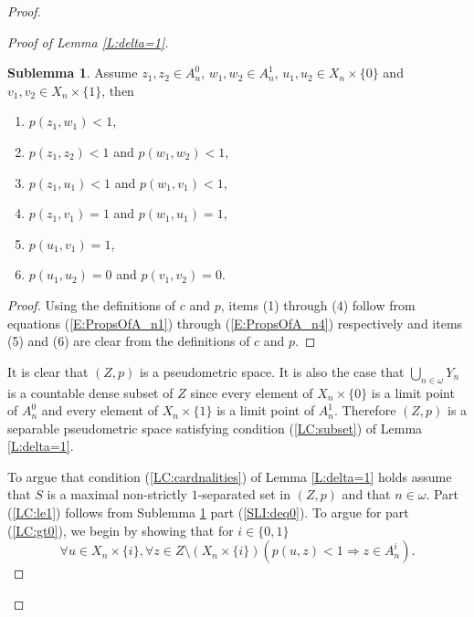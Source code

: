 \documentclass[11pt, reqno]{amsart}
\theoremstyle{definition}
\numberwithin{theorem}{section}
\theoremstyle{definition}
\theoremstyle{definition}
\theoremstyle{definition}
\newtheorem{sublemma}{Sublemma}[theorem]
\theoremstyle{definition}
\theoremstyle{definition}
\numberwithin{claim}{section}
\theoremstyle{definition}
\theoremstyle{definition}
\theoremstyle{definition}
\theoremstyle{definition}
\theoremstyle{definition}
\theoremstyle{remboldstyle}
\begin{document}
\begin{proof}
\begin{proof}[Proof of Lemma \ref{L:delta=1}]
\begin{sublemma}
\label{SL:propsOfp}
Assume $z_1, z_2 \in A_n^0$, $w_1, w_2 \in A_n^1$, $u_1, u_2 \in X_n \times \{ 0 \}$ and $v_1, v_2 \in X_n \times \{ 1 \}$, then
\begin{enumerate} 
\item \label{SLI:no1} $p(z_1, w_1) < 1$,
\item $p(z_1, z_2) < 1$ and $p(w_1,w_2) < 1$,
\item $p(z_1,u_1) < 1$ and $p(w_1,v_1) < 1$,
\item \label{SLI:No4} $p(z_1, v_1) = 1$ and $p(w_1,u_1) = 1$,
\item \label{SLI:No5} $p(u_1,v_1) = 1$,
\item \label{SLI:deq0} $p(u_1,u_2) = 0$ and $p(v_1,v_2) = 0$.
\end{enumerate}
\end{sublemma}
\begin{proof}
Using the definitions of $c$ and $p$, items (1) through (4) follow from equations (\ref{E:PropsOfA_n1}) through (\ref{E:PropsOfA_n4}) respectively and items (5) and (6) are clear from the definitions of $c$ and $p$.  
\end{proof}

It is clear that $(Z,p)$ is a pseudometric space. It is also the case that $\bigcup_{n \in \omega} Y_n$ is a countable dense subset of $Z$ since every element of $X_n \times \{ 0 \}$ is a limit point of $A_n^0$ and every element of $X_n \times \{ 1 \}$ is a limit point of $A_n^1$.  Therefore $(Z,p)$ is a separable pseudometric space satisfying condition (\ref{LC:subset}) of Lemma \ref{L:delta=1}.  
\par
To argue that condition (\ref{LC:cardnalities}) of Lemma \ref{L:delta=1} holds assume that $S$ is a maximal non-strictly $1$-separated set in $(Z,p)$ and that $n \in \omega$.  Part (\ref{LC:le1}) follows from Sublemma \ref{SL:propsOfp} part (\ref{SLI:deq0}).  To argue for part (\ref{LC:gt0}), we begin by showing that for $i \in \{0,1\}$
\begin{equation}
\label{E:Ifpuz<1}
\forall u \in X_n \times \{ i \}, \forall z \in Z \setminus (X_n \times \{ i \})( p(u,z) < 1 \Rightarrow z \in A^i_n ).
\end{equation}


\end{proof}
\end{proof}
\end{document}
